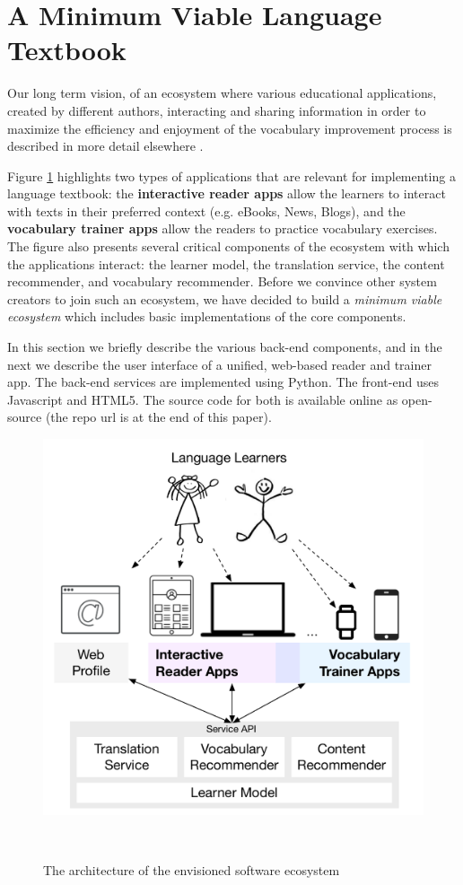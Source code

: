 
\section{A Minimum Viable Language Textbook}
\label{sec:system}

Our long term vision, of an ecosystem where various educational applications, created by different authors, interacting and sharing information in order to maximize the efficiency and enjoyment of the vocabulary improvement process is described in more detail elsewhere \cite{Lungu16}. 

Figure \ref{fig:architecture} highlights two types of applications that are relevant for implementing a language textbook: the {\bf interactive reader apps} allow the learners to interact with texts in their preferred context (e.g. eBooks, News, Blogs), and the {\bf vocabulary trainer apps} allow the readers to practice vocabulary exercises. 
% 
The figure also presents several critical components of the ecosystem with which the applications interact: the learner model, the translation service, the content recommender, and vocabulary recommender. Before we convince other system creators to join such an ecosystem, we have decided to build a {\em minimum viable ecosystem} which includes basic implementations of the core components. 

In this section we briefly describe the various back-end components, and in the next we describe the user interface of a unified, web-based reader and trainer app. The back-end services are implemented using Python. The front-end uses Javascript and HTML5. The source code for both is available online as open-source (the repo url is at the end of this paper).

\begin{figure}[h!]
\centering
  \includegraphics[width=0.60\columnwidth]{figures/zeeguu-architecture.pdf}
  \caption{The architecture of the envisioned software ecosystem}~\label{fig:architecture}
\end{figure}

